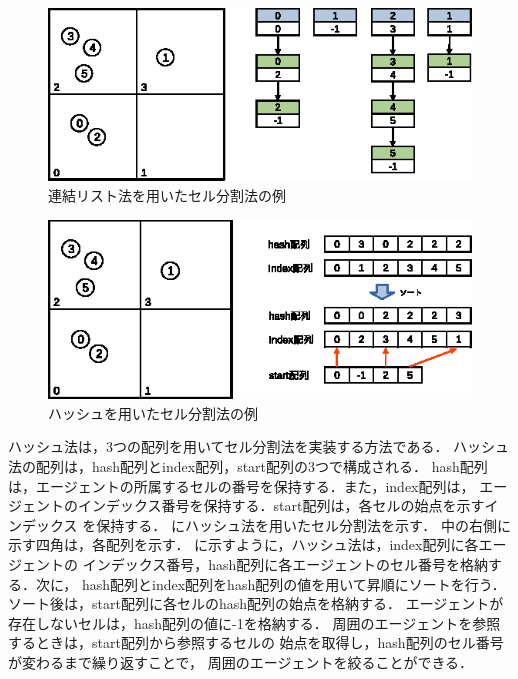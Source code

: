 \begin{figure}[t]
 \begin{center}
  \includegraphics[width=11.5cm,clip]{figure/serubunkatu_serurinku.eps}
  \caption{連結リスト法を用いたセル分割法の例}
  \label{fig:renketu_list}
 \end{center}
\end{figure}

\begin{figure}[t]
 \begin{center}
  \includegraphics[width=11.5cm,clip]{figure/serubunkatu_hash.eps}
  \caption{ハッシュを用いたセル分割法の例}
  \label{fig:hash}
 \end{center}
\end{figure}

ハッシュ法は，3つの配列を用いてセル分割法を実装する方法である．
ハッシュ法の配列は，hash配列とindex配列，start配列の3つで構成される．
hash配列は，エージェントの所属するセルの番号を保持する．また，index配列は，
エージェントのインデックス番号を保持する．start配列は，各セルの始点を示すインデックス
を保持する．
にハッシュ法を用いたセル分割法を示す．
中の右側に示す四角は，各配列を示す．
に示すように，ハッシュ法は，index配列に各エージェントの
インデックス番号，hash配列に各エージェントのセル番号を格納する．次に，
hash配列とindex配列をhash配列の値を用いて昇順にソートを行う．
ソート後は，start配列に各セルのhash配列の始点を格納する．
エージェントが存在しないセルは，hash配列の値に-1を格納する．
周囲のエージェントを参照するときは，start配列から参照するセルの
始点を取得し，hash配列のセル番号が変わるまで繰り返すことで，
周囲のエージェントを絞ることができる．


